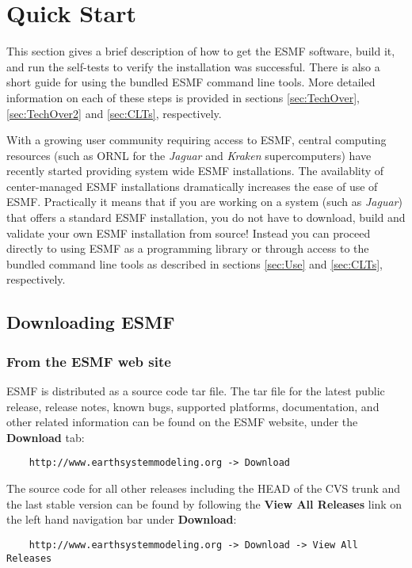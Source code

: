 \section{Quick Start}
\label{sec:QuickStart}

This section gives a brief description of how to get the ESMF software, build 
it, and run the self-tests to verify the installation was successful. There is 
also a short guide for using the bundled ESMF command line tools. More detailed 
information on each of these steps is provided in sections \ref{sec:TechOver},
 \ref{sec:TechOver2} and \ref{sec:CLTs}, respectively.

With a growing user community requiring access to ESMF, central computing 
resources (such as ORNL for the {\it Jaguar} and {\it Kraken} supercomputers) 
have recently started providing system wide ESMF installations. The availablity 
of center-managed ESMF installations dramatically increases the ease of use of 
ESMF. Practically it means that if you are working on a system (such as 
{\it Jaguar}) that offers a standard ESMF installation, you do not have to 
download, build and validate your own ESMF installation from source! Instead you 
can proceed directly to using ESMF as a programming library or through access to 
the bundled command line tools as described in sections \ref{sec:Use} and 
\ref{sec:CLTs}, respectively.

\subsection{Downloading ESMF}
\subsubsection{From the ESMF web site}
\label{sec:download}
ESMF is distributed as a source code tar file.  The tar file for the latest
public release, release notes, 
known bugs, supported platforms, documentation, and other related information 
can be found on the ESMF website, under the {\bf Download} tab:
\begin{verbatim}
    http://www.earthsystemmodeling.org -> Download
\end{verbatim}
The source code for all other releases including the HEAD of the CVS trunk and the
last stable version can be found by following the {\bf View All Releases} link on the left hand navigation bar under {\bf Download}:
\begin{verbatim}
    http://www.earthsystemmodeling.org -> Download -> View All Releases
\end{verbatim}

